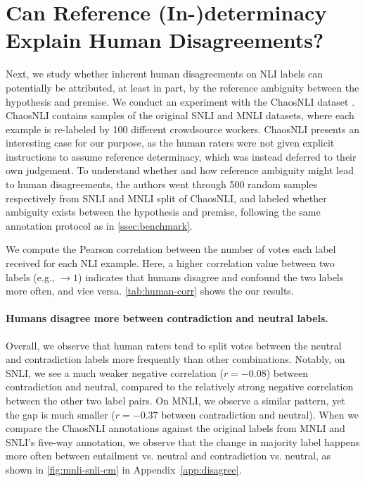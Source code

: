 

\section{Can Reference (In-)determinacy Explain Human Disagreements?}
\label{ssec:human-disagree}

Next, we study whether inherent human disagreements \cite{pavlick-kwiatkowski-2019-inherent} on NLI labels can potentially be attributed, at least in part, by the reference ambiguity between the hypothesis and premise. We conduct an experiment with the ChaosNLI dataset \cite{nie-etal-2020-learn}. ChaosNLI contains samples of the original SNLI and MNLI datasets, where each example is re-labeled by 100 different crowdsource workers. 
ChaosNLI presents an interesting case for our purpose, as the human raters were not given explicit instructions to assume reference determinacy, which was instead deferred to their own judgement. 
To understand whether and how reference ambiguity might lead to human disagreements, the authors went through 500 random samples respectively from SNLI and MNLI split of ChaosNLI, and labeled whether ambiguity exists between the hypothesis and premise, following the same annotation protocol as in \cref{ssec:benchmark}.

We compute the Pearson correlation between the number of votes each label received for each NLI example. Here, a higher correlation value between two labels (e.g., $\rightarrow 1$) indicates that humans disagree and confound the two labels more often, and vice versa. \autoref{tab:human-corr} shows the our results. 


\paragraph{Humans disagree more between contradiction and neutral labels.}
Overall, we observe that human raters tend to split votes between the neutral and contradiction labels more frequently than other combinations.
Notably, on SNLI, we see a much weaker negative correlation ($r=-0.08$) between contradiction and neutral, compared to the relatively strong negative correlation between the other two label pairs. On MNLI, we observe a similar pattern, yet the gap is much smaller ($r=-0.37$ between contradiction and neutral). 
When we compare the ChaosNLI annotations against the original labels from MNLI and SNLI's five-way annotation, we observe that the change in majority label happens more often between entailment vs. neutral and contradiction vs. neutral, as shown in \autoref{fig:mnli-snli-cm} in Appendix~\ref{app:disagree}.


